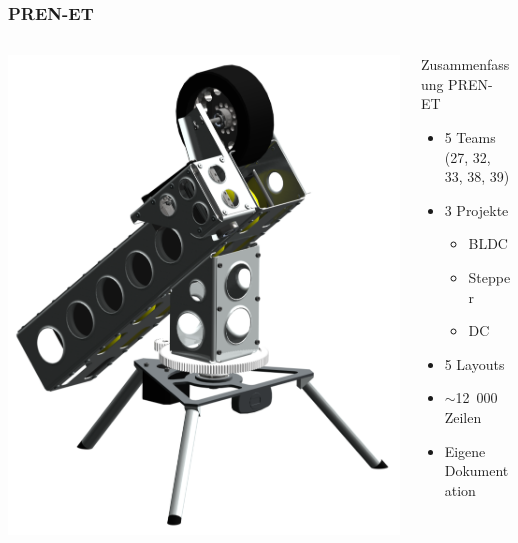 \begin{frame}
    \frametitle{PREN-ET}
    \begin{columns}
        \begin{column}{0.50\textwidth}
            \centering
            \includegraphics[width=1.00\textwidth]{../doc/fig/Bild_mit_Kamera.png}
        \end{column}
        \begin{column}{0.50\textwidth}
            \begin{block}{Zusammenfassung PREN-ET}
                \begin{itemize}
                    \item 5 Teams (27, 32, 33, 38, 39)
                    \item 3 Projekte
                    \begin{itemize}
                        \item BLDC
                        \item Stepper
                        \item DC
                    \end{itemize}
                    \item 5 Layouts
                    \item $\sim$12~000 Zeilen %
                    \item Eigene Dokumentation
                \end{itemize}
            \end{block}
        \end{column}
    \end{columns}
\end{frame}
